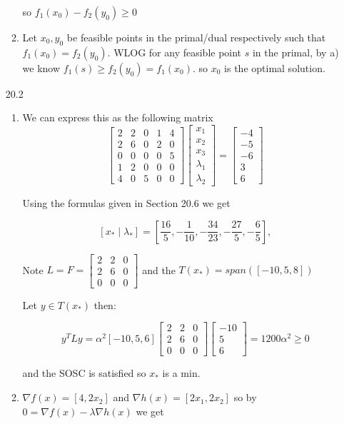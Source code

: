 \documentclass[10pt,a4paper]{article}
\newcommand\m[1]{\begin{bmatrix}#1\end{bmatrix}}
\begin{document}
\begin{enumerate}
\begin{enumerate}
        so $f_1(x_0) -f_2(y_0) \geq 0$

        \item Let $x_0, y_0$ be feasible points in the primal/dual respectively such that $f_1(x_0) = f_2(y_0)$. WLOG for any feasible point $s$ in the primal, by a) we know $f_1(s) \geq f_2(y_0) = f_1(x_0)$. so $x_0$ is the optimal solution.
    \end{enumerate}

    \item [20.2] \begin{enumerate}
        \item We can express this as the following matrix 
        $$\m{
            2 & 2& 0 & 1 & 4 \\
            2 & 6 & 0 & 2 & 0 \\
            0 & 0 & 0 & 0 & 5 \\
            1 & 2 & 0 & 0 & 0 \\
            4 & 0 & 5 & 0 & 0
        } \m{x_1 \\ x_2 \\ x_3 \\ \lambda_1 \\ \lambda_2} = \m{-4 \\ -5 \\ -6 \\ 3 \\ 6}$$

        Using the formulas given in Section 20.6 we get 

        $$[x_* \mid \lambda_*] = [\frac{16}{5}, - \frac{1}{10}, -\frac{34}{23}, -\frac{27}{5}, -\frac{6}{5}], $$

        Note $L = F = \m{ 2 & 2 & 0 \\ 2 & 6 & 0 \\ 0 & 0& 0}$ and the $T(x_*) = span([-10, 5, 8])$

        Let $ y \in T(x_*)$ then:

        $$y^TLy = \alpha^2[-10, 5, 6] \m{ 2 & 2 & 0 \\ 2 & 6 & 0 \\ 0 & 0& 0} \m{-10 \\ 5 \\6} = 1200\alpha^2 \geq 0$$

        and the SOSC is satisfied so $x_*$ is a min.
        
        \item $\nabla f(x) = [ 4, 2x_2]$ and $\nabla h(x) = [2x_1, 2x_2]$ so by $0 = \nabla f(x) - \lambda \nabla h(x)$ we get
    

\end{enumerate}
\end{enumerate}
\end{document}
